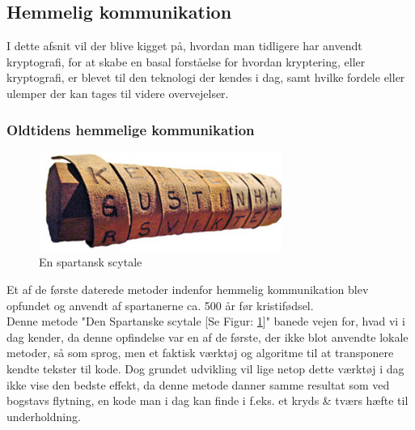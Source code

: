\subsection{Hemmelig kommunikation}
I dette afsnit vil der blive kigget på, hvordan man tidligere har anvendt kryptografi, for at skabe en basal forståelse for hvordan kryptering, eller kryptografi, er blevet til den teknologi der kendes i dag, samt hvilke fordele eller ulemper der kan tages til videre overvejelser.
\subsubsection{Oldtidens hemmelige kommunikation}%

\begin{figure}
    \vspace{-30pt}
    \begin{center}
        \includegraphics[width=0.75\linewidth]{Projectdoc/Problemanalyse/Illustrationer/scytale.jpg}
    \end{center}
    \caption{En spartansk scytale}
    \label{fig:scytale}
\end{figure}
Et af de første daterede metoder indenfor hemmelig kommunikation blev opfundet og anvendt af spartanerne ca. 500 år før kristifødsel. \\
Denne metode "Den Spartanske scytale [Se Figur: \ref{fig:scytale}]" banede vejen for, hvad vi i dag kender, da denne opfindelse var en af de første, der ikke blot anvendte lokale metoder, så som sprog, men et faktisk værktøj og algoritme til at transponere kendte tekster til kode.\cite{PastCryptography}
Dog grundet udvikling vil lige netop dette værktøj i dag ikke vise den bedste effekt, da denne metode danner samme resultat som ved bogstavs flytning, en kode man i dag kan finde i f.eks. et kryds \& tværs hæfte til underholdning.\cite{PastCryptography}

